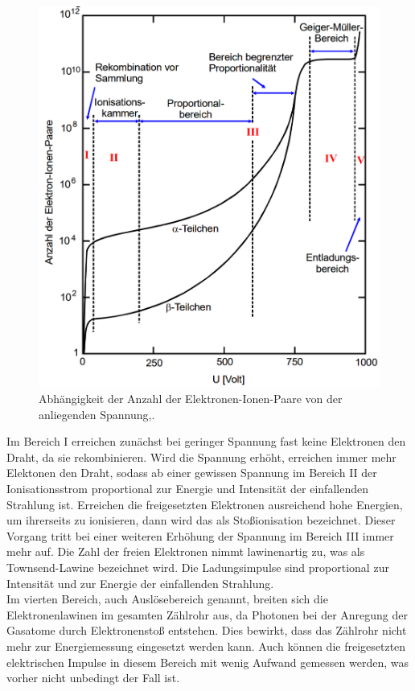 \begin{figure}
  \centering
  \includegraphics[width=\textwidth]{data/nu.png}
  \caption{Abhängigkeit der Anzahl der Elektronen-Ionen-Paare von der anliegenden Spannung,\cite{Versuchsanleitung}.}
  \label{fig:nu}
\end{figure}

Im Bereich I erreichen zunächst bei geringer Spannung fast keine Elektronen den Draht, da sie rekombinieren.
Wird die Spannung erhöht, erreichen immer mehr Elektonen den Draht, sodass ab einer gewissen Spannung
im Bereich II der Ionisationsstrom proportional zur Energie und Intensität der einfallenden Strahlung ist.
Erreichen die freigesetzten Elektronen ausreichend hohe Energien, um ihrerseits zu ionisieren,
dann wird das als Stoßionisation bezeichnet. Dieser Vorgang tritt bei einer weiteren Erhöhung der Spannung im Bereich III immer mehr auf.
Die Zahl der freien Elektronen nimmt lawinenartig zu, was als Townsend-Lawine bezeichnet wird.
Die Ladungsimpulse sind proportional zur Intensität und zur Energie der einfallenden Strahlung.\\
Im vierten Bereich, auch Auslösebereich genannt, breiten sich die Elektronenlawinen
im gesamten Zählrohr aus, da Photonen bei der Anregung der Gasatome durch Elektronenstoß entstehen.
Dies bewirkt, dass das Zählrohr nicht mehr zur Energiemessung eingesetzt werden kann. Auch können die
freigesetzten elektrischen Impulse in diesem Bereich mit wenig Aufwand gemessen werden, was vorher nicht unbedingt der Fall ist.

